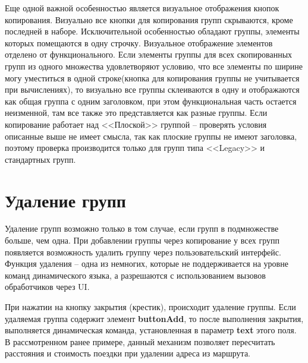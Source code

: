 \documentclass[../index.tex]{subfiles}
\begin{document}
Еще одной важной особенностью является визуальное отображения кнопок копирования. Визуально все кнопки для копирования групп скрываются, кроме последней в наборе.
Исключительной особенностью обладают группы, элементы которых помещаются в одну строчку. Визуальное отображение элементов отделено от функционального. Если элементы группы для всех скопированных групп из одного множества удовлетворяют условию, что все элементы по ширине могу уместиться в одной строке(кнопка для копирования группы не учитывается при вычислениях), то визуально все группы склеиваются в одну и отображаются как общая группа с одним заголовком, при этом функциональная часть остается неизменной, там все также это представляется как разные группы.
Если копирование работает над <<Плоской>> группой -- проверять условия описанные выше не имеет смысла, так как плоские группы не имеют заголовка, поэтому проверка производится только для групп типа <<Legacy>> и стандартных групп.

\section{Удаление групп}

Удаление групп возможно только в том случае, если групп в подмножестве больше, чем одна. При добавлении группы через копирование у всех групп появляется возможность удалить группу через пользовательский интерфейс. Функция удаления -- одна из немногих, которые не поддерживается на уровне команд динамического языка, а разрешаются с использованием вызовов обработчиков через UI.

При нажатии на кнопку закрытия (крестик), происходит удаление группы. Если удаляемая группа содержит элемент \textbf{buttonAdd}, то после выполнения закрытия, выполняется динамическая команда, установленная в параметр \textbf{text} этого поля. В рассмотренном ранее примере, данный механизм позволяет пересчитать расстояния и стоимость поездки при удалении адреса из маршрута.
\end{document}
